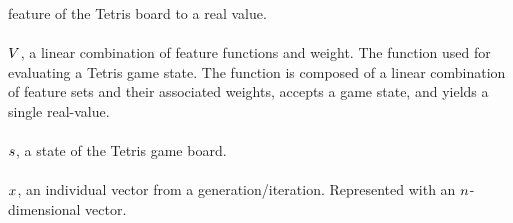 feature of the Tetris board to a real value.\\
\\
$V$, a linear combination of feature functions and weight. 
The function used for evaluating a Tetris game state. 
The function is composed of a linear combination of feature sets and their
associated weights, accepts a game state, and yields a single real-value.\\
\\
$s$, a state of the Tetris game board.\\
\\
$x$, an individual vector from a generation/iteration. 
Represented with an $n$-dimensional vector.


